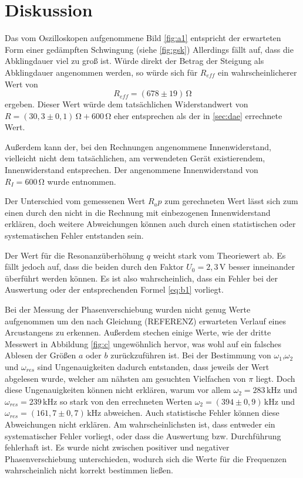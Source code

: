 \section{Diskussion}
\label{sec:Diskussion}
Das vom Oszilloskopen aufgenommene Bild \ref{fig:a1}
entspricht der erwarteten Form einer gedämpften Schwingung (siehe \ref{fig:gsk})
Allerdings fällt auf, dass die Abklingdauer viel zu groß ist.
Würde direkt der Betrag der Steigung als Abklingdauer angenommen werden,
so würde sich für $R_{eff}$ ein wahrscheinlicherer Wert von
\begin{equation*}
    R_{eff}=(678\pm19)\,\si{\ohm}
\end{equation*}
\noindent ergeben. Dieser Wert würde dem tatsächlichen Widerstandwert
von $R=(30,3\pm0,1)\,\si{\ohm} + 600\,\si{\ohm}$ eher entsprechen als der
in \ref{sec:dae} errechnete Wert.


Außerdem kann der, bei den Rechnungen angenommene Innenwiderstand,
vielleicht nicht dem tatsächlichen, am verwendeten Gerät existierendem,
Innenwiderstand entsprechen. Der angenommene Innenwiderstand
von $R_I=600\,\si{\ohm}$ wurde \cite{sample353} entnommen.

Der Unterschied vom gemessenen Wert $R_ap$ zum gerechneten Wert
lässt sich zum einen durch den nicht in die Rechnung 
mit einbezogenen Innenwiderstand erklären, doch weitere Abweichungen
können auch durch  einen statistischen oder systematischen
Fehler entstanden sein.

Der Wert für die Resonanzüberhöhung $q$ weicht stark vom Theoriewert ab.
Es fällt jedoch auf, dass die beiden durch den Faktor $U_0=2,3\,\si{\volt}$
besser inneinander überführt werden können. Es ist also wahrscheinlich,
dass ein Fehler bei der Auswertung oder der entsprechenden Formel \ref{eq:b1}
vorliegt.


Bei der Messung der Phasenverschiebung wurden nicht
genug Werte aufgenommen um den nach Gleichung (REFERENZ)
erwarteten Verlauf eines Arcustangens zu erkennen.
Außerdem stechen einige Werte, wie der dritte Messwert
in Abbildung \ref{fig:c} ungewöhnlich hervor, was
wohl auf ein falsches Ablesen der Größen $a$ oder
$b$ zurückzuführen ist. Bei der Bestimmung
von $\omega_1$,$\omega_2$ und $\omega_{res}$ sind Ungenauigkeiten
dadurch entstanden, dass jeweils der Wert abgelesen wurde,
welcher am nähsten am gesuchten Vielfachen von $\pi$
liegt. Doch diese Ungenauigkeiten können nicht erklären,
warum vor allem $\omega_2=283\,\si{\kilo\hertz}$ und $\omega_{res}=239\,\si{\kilo\hertz}$
so stark von den errechneten Werten
$\omega_2=(394\pm0,9)\,\si{\kilo\hertz}$ und $\omega_{res}=(161,7\pm0,7)\,\si{\kilo\hertz}$
abweichen. Auch statistische Fehler können diese Abweichungen nicht erklären.
Am wahrscheinlichsten ist, dass entweder ein systematischer Fehler vorliegt,
oder dass die Auswertung bzw. Durchführung fehlerhaft ist. 
Es wurde nicht zwischen positiver und negativer Phasenverschiebung unterschieden,
wodurch sich die Werte für die Frequenzen wahrscheinlich nicht 
korrekt bestimmen ließen.
